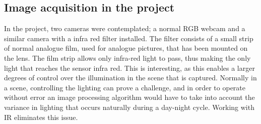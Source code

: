 \subsection{Image acquisition in the project}
 In the project, two cameras were contemplated; a normal RGB webcam and a similar camera with a infra red filter installed. The filter consists of a small strip of normal analogue film, used for analogue pictures, that has been mounted on the lens. The film strip allows only infra-red light to pass, thus making the only light that reaches the sensor infra red.  This is interesting, as this enables a larger degrees of control over the illumination in the scene that is captured. Normally in a scene, controlling the lighting   can prove a challenge, and in order to operate without error an image processing algorithm would have to take into account the variance in lighting that occurs naturally during a day-night cycle. Working with IR eliminates this issue.


